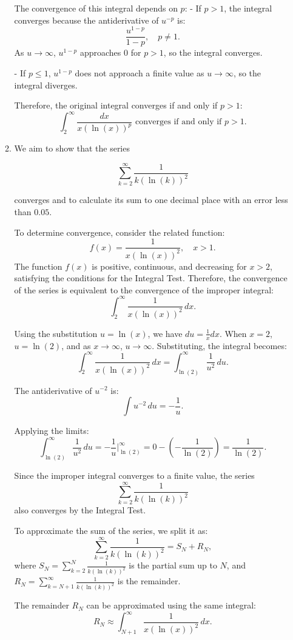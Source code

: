\documentclass[12pt]{article}
\begin{document}
\begin{enumerate}
\begin{enumerate}
The convergence of this integral depends on \( p \):
- If \( p > 1 \), the integral converges because the antiderivative of \( u^{-p} \) is:
\[
\frac{u^{1-p}}{1-p}, \quad p \neq 1.
\]
As \( u \to \infty \), \( u^{1-p} \) approaches 0 for \( p > 1 \), so the integral converges.

- If \( p \leq 1 \), \( u^{1-p} \) does not approach a finite value as \( u \to \infty \), so the integral diverges.

Therefore, the original integral converges if and only if \( p > 1 \):
\[
\int_2^\infty \frac{dx}{x(\ln(x))^p} \text{ converges if and only if } p > 1.
\]

\item 
We aim to show that the series 

\[
\sum_{k=2}^\infty \frac{1}{k (\ln(k))^2}
\]

converges and to calculate its sum to one decimal place with an error less than \(0.05\).

To determine convergence, consider the related function:
\[
f(x) = \frac{1}{x (\ln(x))^2}, \quad x > 1.
\]
The function \(f(x)\) is positive, continuous, and decreasing for \(x > 2\), satisfying the conditions for the Integral Test. Therefore, the convergence of the series is equivalent to the convergence of the improper integral:
\[
\int_2^\infty \frac{1}{x (\ln(x))^2} \, dx.
\]

Using the substitution \( u = \ln(x) \), we have \( du = \frac{1}{x} dx \). When \(x = 2\), \(u = \ln(2)\), and as \(x \to \infty\), \(u \to \infty\). Substituting, the integral becomes:
\[
\int_2^\infty \frac{1}{x (\ln(x))^2} \, dx = \int_{\ln(2)}^\infty \frac{1}{u^2} \, du.
\]

The antiderivative of \(u^{-2}\) is:
\[
\int u^{-2} \, du = -\frac{1}{u}.
\]

Applying the limits:
\[
\int_{\ln(2)}^\infty \frac{1}{u^2} \, du = -\frac{1}{u} \Big|_{\ln(2)}^\infty = 0 - \left(-\frac{1}{\ln(2)}\right) = \frac{1}{\ln(2)}.
\]

Since the improper integral converges to a finite value, the series 
\[
\sum_{k=2}^\infty \frac{1}{k (\ln(k))^2}
\]
also converges by the Integral Test.

To approximate the sum of the series, we split it as:
\[
\sum_{k=2}^\infty \frac{1}{k (\ln(k))^2} = S_N + R_N,
\]
where \(S_N = \sum_{k=2}^N \frac{1}{k (\ln(k))^2}\) is the partial sum up to \(N\), and \(R_N = \sum_{k=N+1}^\infty \frac{1}{k (\ln(k))^2}\) is the remainder.

The remainder \(R_N\) can be approximated using the same integral:
\[
R_N \approx \int_{N+1}^\infty \frac{1}{x (\ln(x))^2} \, dx.
\]


\end{enumerate}
\end{enumerate}
\end{document}
